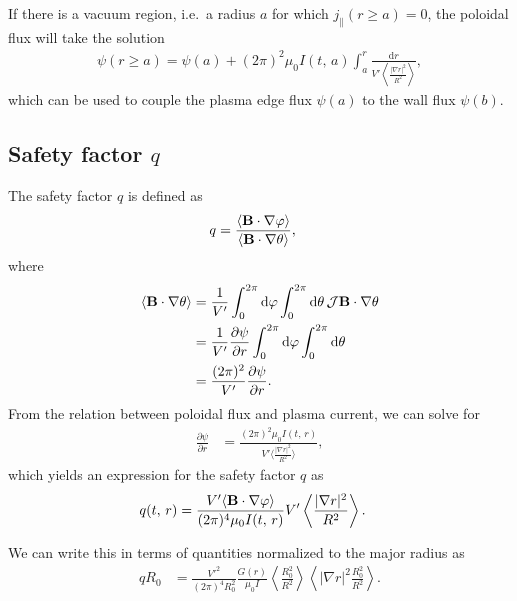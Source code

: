 \documentclass[11pt,a4paper]{article}
\newcommand{\rd}{\ensuremath{\mathrm{d}}}
\renewcommand{\b}[1]{\ensuremath{ {\bf #1 } }}
\begin{document}
If there is a vacuum region, i.e.~a radius $a$ for which $j_\parallel(r\geq a) = 0$, the poloidal flux will take the solution 
\begin{align}
\psi(r\geq a) = \psi(a) + (2\pi)^2\mu_0 I(t,\,a) \int_a^r \frac{\rd r}{V'\left\langle \frac{|\nabla r|^2}{R^2}\right\rangle },
\end{align}
which can be used to couple the plasma edge flux $\psi(a)$ to the wall flux $\psi(b)$.

\subsection{Safety factor $q$}
The safety factor $q$ is defined as
\begin{align}
q &= \frac{\langle \b{B}\cdot\nabla\varphi\rangle}{\langle \b{B}\cdot\nabla\theta\rangle},
\end{align}
where
\begin{align}
\langle \b{B}\cdot\nabla\theta \rangle &= \frac{1}{V'} \int_0^{2\pi} \rd \varphi \int_0^{2\pi}\rd\theta \,\mathcal{J} \b{B}\cdot\nabla \theta \nonumber \\
&=\frac{1}{V'}\frac{\partial \psi}{\partial r} \int_0^{2\pi} \rd \varphi \int_0^{2\pi}\rd\theta  \nonumber \\
&= \frac{(2\pi)^2}{V'}\frac{\partial \psi}{\partial r}.
\end{align}
From the relation between poloidal flux and plasma current, we can solve for
\begin{align}
\frac{\partial \psi}{\partial r} &= \frac{(2\pi)^2 \mu_0 I(t,\,r)}{V'\langle\frac{|\nabla r|^2}{R^2}\rangle},
\end{align}
which yields an expression for the safety factor $q$ as
\begin{align}
q(t,\,r) &= \frac{V'\langle \b{B}\cdot\nabla\varphi\rangle}{(2\pi)^4 \mu_0 I(t,\,r)}V'\left\langle\frac{|\nabla r|^2}{R^2}\right\rangle.
\end{align}

We can write this in terms of quantities normalized to the major radius as
\begin{align}
q R_0 &=  \frac{V'^2}{(2\pi)^4R_0^2} \frac{G(r)}{\mu_0 I} \left\langle \frac{R_0^2}{R^2}\right\rangle\left\langle|\nabla r|^2 \frac{R_0^2}{R^2}\right\rangle.
\end{align}
\end{document}
